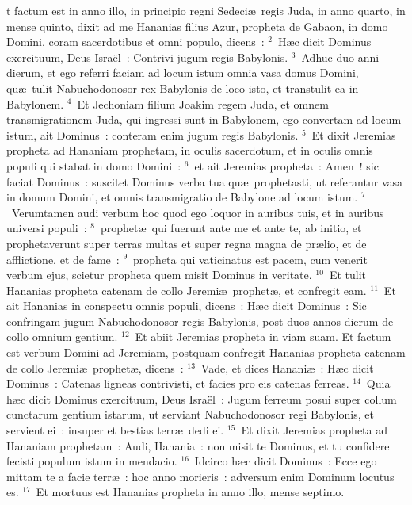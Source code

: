 \bchapter
{}t factum est in anno illo, in principio regni Sedeci\ae\ regis Juda, in anno quarto, in mense quinto, dixit ad me Hananias filius Azur, propheta de Gabaon, in domo Domini, coram sacerdotibus et omni populo, dicens~:
${}^{2}$~H\ae c dicit Dominus exercituum, Deus Isra\"el~: Contrivi jugum regis Babylonis.
${}^{3}$~Adhuc duo anni dierum, et ego referri faciam ad locum istum omnia vasa domus Domini, qu\ae\ tulit Nabuchodonosor rex Babylonis de loco isto, et transtulit ea in Babylonem.
${}^{4}$~Et Jechoniam filium Joakim regem Juda, et omnem transmigrationem Juda, qui ingressi sunt in Babylonem, ego convertam ad locum istum, ait Dominus~: conteram enim jugum regis Babylonis.
${}^{5}$~Et dixit Jeremias propheta ad Hananiam prophetam, in oculis sacerdotum, et in oculis omnis populi qui stabat in domo Domini~:
${}^{6}$~et ait Jeremias propheta~: Amen~! sic faciat Dominus~: suscitet Dominus verba tua qu\ae\ prophetasti, ut referantur vasa in domum Domini, et omnis transmigratio de Babylone ad locum istum.
${}^{7}$~Verumtamen audi verbum hoc quod ego loquor in auribus tuis, et in auribus universi populi~:
${}^{8}$~prophet\ae\ qui fuerunt ante me et ante te, ab initio, et prophetaverunt super terras multas et super regna magna de pr\ae lio, et de afflictione, et de fame~:
${}^{9}$~propheta qui vaticinatus est pacem, cum venerit verbum ejus, scietur propheta quem misit Dominus in veritate.
${}^{10}$~Et tulit Hananias propheta catenam de collo Jeremi\ae\ prophet\ae , et confregit eam.
${}^{11}$~Et ait Hananias in conspectu omnis populi, dicens~: H\ae c dicit Dominus~: Sic confringam jugum Nabuchodonosor regis Babylonis, post duos annos dierum de collo omnium gentium.
${}^{12}$~Et abiit Jeremias propheta in viam suam. Et factum est verbum Domini ad Jeremiam, postquam confregit Hananias propheta catenam de collo Jeremi\ae\ prophet\ae , dicens~:
${}^{13}$~Vade, et dices Hanani\ae~: H\ae c dicit Dominus~: Catenas ligneas contrivisti, et facies pro eis catenas ferreas.
${}^{14}$~Quia h\ae c dicit Dominus exercituum, Deus Isra\"el~: Jugum ferreum posui super collum cunctarum gentium istarum, ut serviant Nabuchodonosor regi Babylonis, et servient ei~: insuper et bestias terr\ae\ dedi ei.
${}^{15}$~Et dixit Jeremias propheta ad Hananiam prophetam~: Audi, Hanania~: non misit te Dominus, et tu confidere fecisti populum istum in mendacio.
${}^{16}$~Idcirco h\ae c dicit Dominus~: Ecce ego mittam te a facie terr\ae~: hoc anno morieris~: adversum enim Dominum locutus es.
${}^{17}$~Et mortuus est Hananias propheta in anno illo, mense septimo.

